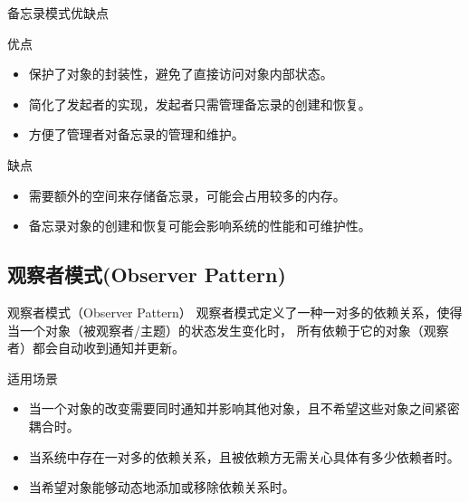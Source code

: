 \documentclass[UTF8,aspectratio=169]{beamer}
\begin{document}
\begin{frame}{备忘录模式优缺点}
    \begin{ytublock}{优点}
        \begin{itemize}
            \item 保护了对象的封装性，避免了直接访问对象内部状态。
            \item 简化了发起者的实现，发起者只需管理备忘录的创建和恢复。
            \item 方便了管理者对备忘录的管理和维护。
        \end{itemize}
    \end{ytublock}
    \begin{alertytublock}{缺点}
        \begin{itemize}
            \item 需要额外的空间来存储备忘录，可能会占用较多的内存。
            \item 备忘录对象的创建和恢复可能会影响系统的性能和可维护性。
        \end{itemize}
    \end{alertytublock}
\end{frame}

\subsection{观察者模式(Observer Pattern)}

\begin{frame}{观察者模式（Observer Pattern）}
    观察者模式定义了一种一对多的依赖关系，使得当一个对象（被观察者/主题）的状态发生变化时，
    所有依赖于它的对象（观察者）都会自动收到通知并更新。
    \begin{ytublock}{适用场景}
        \begin{itemize}
            \item 当一个对象的改变需要同时通知并影响其他对象，且不希望这些对象之间紧密耦合时。
            \item 当系统中存在一对多的依赖关系，且被依赖方无需关心具体有多少依赖者时。
            \item 当希望对象能够动态地添加或移除依赖关系时。
        \end{itemize}
    \end{ytublock}
\end{frame}
\end{document}
